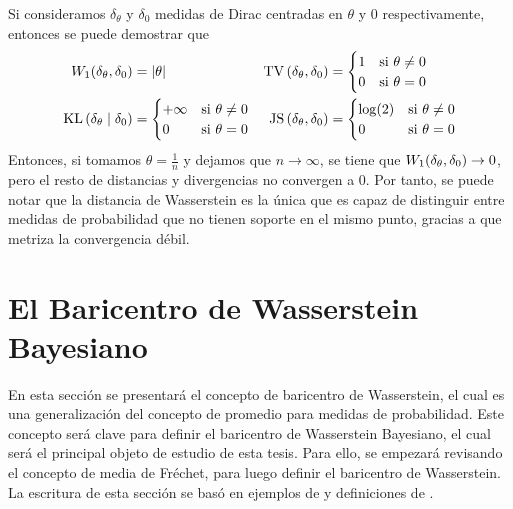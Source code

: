 {{\begin{example}
			Si consideramos $\delta_\theta$ y $\delta_0$ medidas de Dirac centradas en $\theta$ y $0$ respectivamente, entonces se puede demostrar que
			\begin{align*}
				\Wasserstein[1]{\delta_\theta}{\delta_0} & = |\theta|                            &
				\TV{\delta_\theta}{\delta_0}             & = \begin{cases}
					                                             1 & \text{si } \theta \neq 0 \\
					                                             0 & \text{si } \theta = 0
				                                             \end{cases}          \\
				\KL{\delta_\theta}{\delta_0}             & = \begin{cases}
					                                             +\infty & \text{si } \theta \neq 0 \\
					                                             0       & \text{si } \theta = 0
				                                             \end{cases} &
				\JS{\delta_\theta}{\delta_0}             & = \begin{cases}
					                                             \log(2) & \text{si } \theta \neq 0 \\
					                                             0       & \text{si } \theta = 0
				                                             \end{cases}
			\end{align*}
			Entonces, si tomamos $\theta = \frac{1}{n} $ y dejamos que $n \to \infty$, se tiene que $\Wasserstein[1]{\delta_\theta}{\delta_0} \to 0$, pero el resto de distancias y divergencias no convergen a 0.
			Por tanto, se puede notar que la distancia de Wasserstein es la única que es capaz de distinguir entre medidas de probabilidad que no tienen soporte en el mismo punto, gracias a que metriza la convergencia débil.
		\end{example}

	}  %

	\section{El Baricentro de Wasserstein Bayesiano}\label{sec:el-baricentro-de-Wasserstein-Bayesiano}
	{
		En esta sección se presentará el concepto de baricentro de Wasserstein, el cual es una generalización del concepto de promedio para medidas de probabilidad. Este concepto será clave para definir el baricentro de Wasserstein Bayesiano, el cual será el principal objeto de estudio de esta tesis. Para ello, se empezará revisando el concepto de media de Fréchet, para luego definir el baricentro de Wasserstein. La escritura de esta sección se basó en ejemplos de \cite{panaretos2020invitation} y definiciones de \cite{peyre2019computational}.

}}

